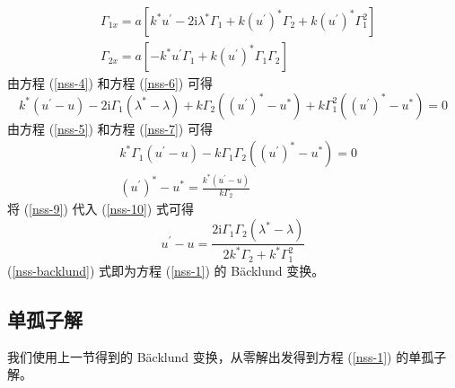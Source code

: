 \begin{align}
  & \Gamma_{1x} = a\left[k^{*}u^{'} - 2\mathrm{i}\lambda^{*}\Gamma_{1} + k(u^{'})^{*}\Gamma_{2} + k(u^{'})^{*}\Gamma_{1}^{2}\right]  \label{nss-6}\\
  & \Gamma_{2x} = a\left[-k^{*}u^{'}\Gamma_{1} + k(u^{'})^{*}\Gamma_{1}\Gamma_{2}\right]  \label{nss-7}
\end{align}
由方程 (\ref{nss-4}) 和方程 (\ref{nss-6}) 可得
\begin{equation}
  k^{*}(u^{'}-u) - 2\mathrm{i}\Gamma_{1}(\lambda^{*}-\lambda) + k\Gamma_{2}((u^{'})^{*}-u^{*}) + k\Gamma_{1}^{2}((u^{'})^{*}-u^{*}) = 0  \label{nss-10}
\end{equation}
由方程 (\ref{nss-5}) 和方程 (\ref{nss-7}) 可得
\begin{align}
  & k^{*}\Gamma_{1}(u^{'}-u) - k\Gamma_{1}\Gamma_{2}((u^{'})^{*}-u^{*}) = 0 \\
  & (u^{'})^{*} - u^{*} = \frac{k^{*}(u^{'}-u)}{k\Gamma_{2}}  \label{nss-9}
\end{align}
将 (\ref{nss-9}) 代入 (\ref{nss-10}) 式可得
\begin{equation}
  u^{'} - u = \frac{2\mathrm{i}\Gamma_{1}\Gamma_{2}(\lambda^{*}-\lambda)}{2k^{*}\Gamma_{2} + k^{*}\Gamma_{1}^{2}} \label{nss-backlund}
\end{equation}
(\ref{nss-backlund}) 式即为方程 (\ref{nss-1}) 的 B\"acklund 变换。

\subsection{单孤子解}
我们使用上一节得到的 B\"acklund 变换，从零解出发得到方程 (\ref{nss-1}) 的单孤子解。

